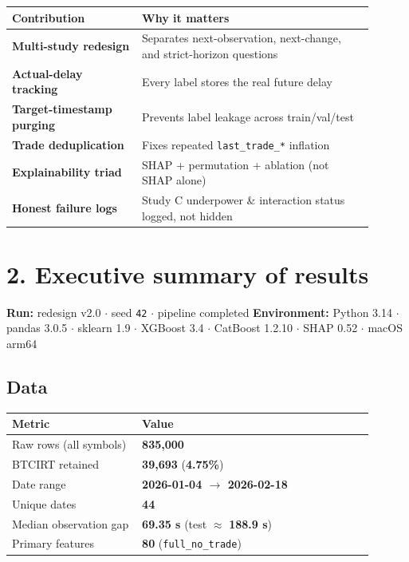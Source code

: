 \documentclass[11pt,a4paper]{article}
\begin{document}
\begin{center}
\begin{tabular}{L{0.32\linewidth}L{0.58\linewidth}}
\toprule
Contribution & Why it matters \\
\midrule
\textbf{Multi-study redesign} & Separates next-observation, next-change, and strict-horizon questions \\
\textbf{Actual-delay tracking} & Every label stores the real future delay \\
\textbf{Target-timestamp purging} & Prevents label leakage across train/val/test \\
\textbf{Trade deduplication} & Fixes repeated \texttt{last\_trade\_*} inflation \\
\textbf{Explainability triad} & SHAP + permutation + ablation (not SHAP alone) \\
\textbf{Honest failure logs} & Study C underpower \& interaction status logged, not hidden \\
\bottomrule
\end{tabular}
\end{center}
\vspace{0.35em}

\vspace{0.5em}

\section{2. Executive summary of results}

\textbf{Run:} redesign v2.0 $\cdot$ seed \texttt{42} $\cdot$ pipeline completed \textbf{Environment:} Python 3.14 $\cdot$ pandas 3.0.5 $\cdot$ sklearn 1.9 $\cdot$ XGBoost 3.4 $\cdot$ CatBoost 1.2.10 $\cdot$ SHAP 0.52 $\cdot$ macOS arm64


\subsection{Data}

\begin{center}
\begin{tabular}{L{0.32\linewidth}L{0.58\linewidth}}
\toprule
Metric & Value \\
\midrule
Raw rows (all symbols) & \textbf{835,000} \\
BTCIRT retained & \textbf{39,693} (\textbf{4.75\%}) \\
Date range & \textbf{2026-01-04 $\rightarrow$ 2026-02-18} \\
Unique dates & \textbf{44} \\
Median observation gap & \textbf{69.35 s} (test $\approx$ \textbf{188.9 s}) \\
Primary features & \textbf{80} (\texttt{full\_no\_trade}) \\
\bottomrule
\end{tabular}
\end{center}
\vspace{0.35em}
\end{document}
